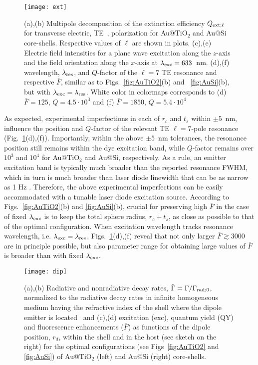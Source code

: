\documentclass[9pt,twocolumn,twoside]{osajnl}
\newcommand{\ld}{\lambda}
\newcommand{\Gm}{\Gamma}
\begin{document}
\begin{figure}[t]
 \centering
 \texttt{[image: ext]}
 \caption{(a),(b) Multipole decomposition of the extinction efficiency $Q_{{\rm ext};\ell}$ for transverse electric, TE~\cite[Eq. (19)]{Rasskazov20OSAC}, polarization for Au@TiO$_2$ and Au@Si core-shells.
 Respective values of $\ell$ are shown in plots.
 (c),(e) Electric field intensities for a plane wave excitation along the $z$-axis and the field orientation along the $x$-axis at $\ld_{\rm exc}=633$~nm.
 (d),(f) wavelength, $\ld_{\rm res}$, and $Q$-factor of the $\ell=7$ TE resonance and 
 respective $\bar F$, similar as to Figs.~\ref{fig:AuTiO2}(b) and ~\ref{fig:AuSi}(b), but with $\ld_{\rm exc}=\ld_{\rm res}$.
 White color in colormaps corresponds to (d) $\bar F=125$, $Q=4.5\cdot 10^3$ and (f) $\bar F=1850$, $Q=5.4\cdot 10^4$}
 \label{fig:ext}
\end{figure}
As expected, experimental imperfections in each of $r_c$ and $t_s$ within $\pm 5$~nm, influence the position and $Q$-factor of the relevant TE $\ell=7$-pole resonance (Fig.~\ref{fig:ext}(d),(f)). 
Importantly, within the above $\pm 5$~nm tolerances, the resonance position still remains within the dye excitation band, while $Q$-factor remains over $10^3$ and $10^4$ for Au@TiO$_2$ and Au@Si, respectively. 
As a rule, an emitter excitation band is typically much broader than the reported resonance FWHM, which in turn is much broader than laser diode linewidth that can be as narrow as 1 Hz \cite{Stoehr2006}.
Therefore, the above experimental imperfections can be easily accommodated with a tunable laser diode excitation source.
According to Figs.~\ref{fig:AuTiO2}(b) and \ref{fig:AuSi}(b), crucial for preserving high $\bar F$ in the case of fixed $\ld_{\rm exc}$ is to keep the total sphere radius, $r_c+t_s$, as close as possible to that of the optimal configuration.
When excitation wavelength tracks resonance wavelength, i.e. $\ld_{\rm exc}=\ld_{\rm res}$, Figs.~\ref{fig:ext}(d),(f) reveal that not only larger $\bar F\gtrsim 3000$ are in principle possible, but also parameter range for obtaining large values of $\bar F$ is broader than with fixed $\ld_{\rm exc}$.
\begin{figure}[t]
 \centering
 \texttt{[image: dip]}
 \caption{(a),(b) Radiative and nonradiative decay rates, $\tilde{\Gm}=\Gm/\Gm_{{\rm rad};0}$, normalized to the radiative decay rates in infinite homogeneous medium having the refractive index of the shell where the dipole emitter is located~\cite[Eqs.(28)-(29)]{Rasskazov20OSAC} and 
 (c),(d) excitation (exc), quantum yield (QY) and fluorescence enhancements ($\bar F$) as functions of the dipole position, $r_d$, within the shell and in the host (see sketch on the right) for the optimal configurations (see Figs~\ref{fig:AuTiO2} and \ref{fig:AuSi}) of Au@TiO$_2$ (left) and Au@Si (right) core-shells.}
 \label{fig:pos}
\end{figure}
\end{document}
